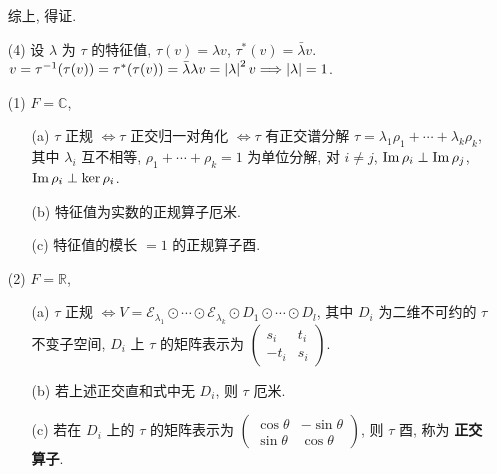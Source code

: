 \documentclass{note}
\begin{document}
\begin{pf}
\begin{itemize}
        综上, 得证.
        \item[(4)] 设 $\lambda$ 为 $\tau$ 的特征值, $\tau(v)=\lambda v$, $\tau^*(v)=\bar{\lambda}v$.\\
        $v=\tau^{-1}(\tau(v))=\tau^*(\tau(v))=\bar{\lambda}\lambda v=\left\lvert\lambda\right\rvert^2v\Longrightarrow\left\lvert\lambda\right\rvert=1$.
    \end{itemize}
\end{pf}

\begin{thm}
    \begin{itemize}
        \item[(1)] $F=\mathbb{C}$,
        \begin{itemize}
            \item[(a)] $\tau$ 正规 $\Longleftrightarrow\tau$ 正交归一对角化 $\Longleftrightarrow\tau$ 有正交谱分解 $\tau=\lambda_1\rho_1+\cdots+\lambda_k\rho_k$, 其中 $\lambda_i$ 互不相等, $\rho_1+\cdots+\rho_k=1$ 为单位分解, 对 $i\neq j$, $\operatorname{Im}\rho_i\perp\operatorname{Im}\rho_j$, $\operatorname{Im}\rho_i\perp\ker\rho_i$.
            \item[(b)] 特征值为实数的正规算子厄米.
            \item[(c)] 特征值的模长 $=1$ 的正规算子酉.
        \end{itemize}
        \item[(2)] $F=\mathbb{R}$,
        \begin{itemize}
            \item[(a)] $\tau$ 正规 $\Longleftrightarrow V=\mathcal{E}_{\lambda_1}\odot\cdots\odot\mathcal{E}_{\lambda_k}\odot D_1\odot\cdots\odot D_l$, 其中 $D_i$ 为二维不可约的 $\tau$ 不变子空间, $D_i$ 上 $\tau$ 的矩阵表示为 $\begin{pmatrix}
                s_i&t_i\\
                -t_i&s_i
            \end{pmatrix}$.
            \item[(b)] 若上述正交直和式中无 $D_i$, 则 $\tau$ 厄米.
            \item[(c)] 若在 $D_i$ 上的 $\tau$ 的矩阵表示为 $\begin{pmatrix}
                \cos\theta&-\sin\theta\\
                \sin\theta&\cos\theta
            \end{pmatrix}$, 则 $\tau$ 酉, 称为 \textbf{正交算子}.
        \end{itemize}
    \end{itemize}
\end{thm}
\end{document}
